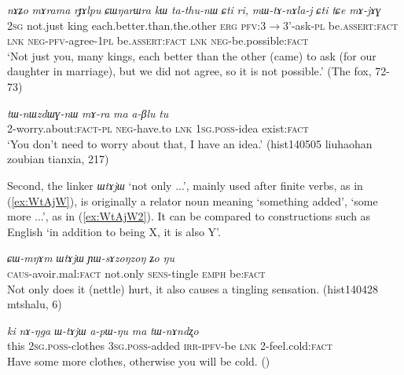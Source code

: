 \documentclass[oneside,a4paper,11pt]{article}
\newcommand{\ipa}[1]{\mbox{\phon\textit{#1}}} %
\begin{document}
\begin{exe}
\ex \label{ex:marama}
\gll \ipa{nɤʑo} 	\ipa{mɤrama} 	\ipa{rɟɤlpu} 	\ipa{ɕɯŋarɯra} 	\ipa{kɯ} 	\ipa{ta-thu-nɯ} 	\ipa{ɕti} 	\ipa{ri,} 	\ipa{mɯ-tɤ-nɤla-j} 	\ipa{ɕti} 	\ipa{tɕe} 	\ipa{mɤ-jɤɣ}  \\
\textsc{2sg} not.just king each.better.than.the.other \textsc{erg} \textsc{pfv}:3$\rightarrow$3'-ask-\textsc{pl} be.\textsc{assert:fact} \textsc{lnk} \textsc{neg-pfv}-agree-\textsc{1pl} be.\textsc{assert:fact} \textsc{lnk} \textsc{neg}-be.possible:\textsc{fact} \\
\glt `Not just you, many kings, each better than the other (came) to ask (for our daughter in marriage), but we did not agree, so it is not possible.' (The fox, 72-73)
\end{exe}

\begin{exe}
\ex \label{ex:marama2}
\gll
\ipa{tɯ-nɯzdɯɣ-nɯ} 	\ipa{mɤ-ra} 	\ipa{ma} 	\ipa{a-βlu} 	\ipa{tu}\\
2-worry.about:\textsc{fact-pl} \textsc{neg}-have.to \textsc{lnk} \textsc{1sg.poss}-idea exist:\textsc{fact}\\
\glt `You don't need to worry about that, I have an idea.' (hist140505 liuhaohan zoubian tianxia, 217)
\end{exe}
 

Second, the linker \ipa{ɯtɤjɯ} `not only ...', mainly used after finite verbs, as in (\ref{ex:WtAjW}), is originally a relator noun meaning `something added', `some more ...', as in (\ref{ex:WtAjW2}). It can be compared to constructions such as English `in addition to being X, it is also Y'.

\begin{exe}
\ex \label{ex:WtAjW}
\gll \ipa{ɕɯ-mŋɤm} 	\ipa{ɯtɤjɯ} 	\ipa{ɲɯ-sɤzoŋzoŋ} 	\ipa{ʑo} 	\ipa{ŋu}  \\
\textsc{caus}-avoir.mal:\textsc{fact} not.only \textsc{sens}-tingle \textsc{emph} be:\textsc{fact} \\
\glt Not only does it (nettle) hurt, it also causes a tingling sensation. (hist140428 mtshalu, 6)
\end{exe}

\begin{exe}
\ex \label{ex:WtAjW2}
\gll \ipa{ki} 	\ipa{nɤ-ŋga} 	\ipa{ɯ-tɤjɯ} 	\ipa{a-pɯ-ŋu} 	\ipa{ma} 	\ipa{tɯ-nɤndʐo} \\
this \textsc{2sg.poss}-clothes \textsc{3sg.poss}-added \textsc{irr-ipfv}-be \textsc{lnk} 2-feel.cold:\textsc{fact} \\
\glt Have some more clothes, otherwise you will be cold. (\citealt{jacques15japhug})
\end{exe}
\end{document}
